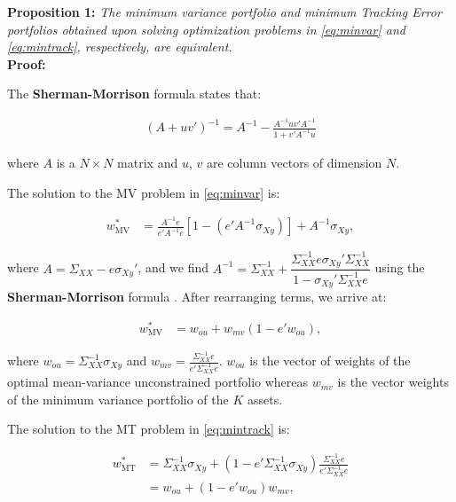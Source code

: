 \documentclass[12pt,oneside,a4paper]{memoir}
\begin{document}
\noindent \textbf{Proposition 1:}
\textit{The minimum variance portfolio and minimum Tracking Error portfolios obtained upon solving optimization problems in \eqref{eq:minvar} and \eqref{eq:mintrack}, respectively, are equivalent.} \\

\noindent \textbf{Proof:} 

The \textbf{Sherman-Morrison} formula \cite{matcook2012} states that:

\vspace{-18 pt}
\begin{align*}
(A + uv')^{-1} = A^{-1} - \frac{A^{-1}uv'A^{-1}}{1+v'A^{-1}u}
\end{align*}

\noindent
where $A$ is a $N \times N$ matrix and $u$, $v$ are column vectors of dimension $N$.

The solution to the MV problem in \eqref{eq:minvar} is:

\vspace{-18 pt}
\begin{align*}
w^*_{\text{MV}} &= \frac{A^{-1}e}{e'A^{-1}e} [1 - (e'A^{-1}\sigma_{Xy})] + A^{-1}\sigma_{Xy},
\end{align*}

\noindent
where $A = \Sigma_{XX} - e\sigma_{Xy}'$, and we find  
$A^{-1} = \Sigma_{XX}^{-1} +\dfrac{\Sigma_{XX}^{-1}e\sigma_{Xy}'\Sigma_{XX}^{-1}}{1-\sigma_{Xy}'\Sigma_{XX}^{-1}e}$ using the \textbf{Sherman-Morrison} formula \cite{matcook2012}.
After rearranging terms, we arrive at:

\vspace{-18 pt}
\begin{align}\label{eq:minvarsol}
w^*_{\text{MV}} &= w_{ou} + w_{mv}(1-e'w_{ou}),
\end{align}

\noindent
where $w_{ou} = \Sigma_{XX}^{-1}\sigma_{Xy}$ and $w_{mv} = \frac{\Sigma_{XX}^{-1}e}{e'\Sigma_{XX}^{-1}e}$. $w_{ou}$ is the vector of weights of the optimal mean-variance unconstrained portfolio whereas $w_{mv}$ is the vector weights of the minimum variance portfolio of the $K$ assets. 

The solution to the MT problem in \eqref{eq:mintrack} is:

\vspace{-18 pt}
\begin{align}
w^*_{\text{MT}} &= \Sigma_{XX}^{-1} \sigma_{Xy}
+ (1 - e'\Sigma_{XX}^{-1} \sigma_{Xy})
\frac{\Sigma_{XX}^{-1}e}{e'\Sigma_{XX}^{-1}e}
\\
&= w_{ou} + (1 - e'w_{ou})w_{mv},
\end{align}
\end{document}

